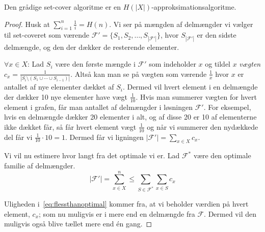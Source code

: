 \begin{theorem}
	Den grådige set-cover algoritme er en $H(|X|)$-approksimationsalgoritme.
\end{theorem}
\begin{proof}
	Husk at $\sum_{i=1}^n \frac{1}{i} = H(n)$. Vi ser på mængden af delmængder vi vælger til set-coveret som værende $\mathcal{F}' = \{S_{1}, S_{2}, \ldots, S_{|\mathcal{F}'|}\}$, hvor $S_{|\mathcal{F}'|}$ er den sidste delmængde, og den der dækker de resterende elementer.

	$\forall x \in X$: Lad $S_{i}$ være den første mængde i $\mathcal{F}'$ som indeholder $x$ og tildel $x$ \textit{vægten} $c_{x} = \frac{1}{|S_{i} \setminus (S_{1} \cup \cdots \cup S_{i-1})|}$. Altså kan man se på vægten som værende $\frac{1}{x}$ hvor $x$ er antallet af nye elementer dækket af $S_{i}$. Dermed vil hvert element i en delmængde der dækker 10 nye elementer have vægt $\frac{1}{10}$. Hvis man summerer vægten for hvert element i grafen, får man antallet af delmængder i løsningen $\mathcal{F}'$. For eksempel, hvis en delmængde dækker 20 elementer i alt, og af disse 20 er 10 af elementerne ikke dækket får, så får hvert element vægt $\frac{1}{10}$ og når vi summerer den nydækkede del får vi $\frac{1}{10} \cdot 10 = 1$. Dermed får vi ligningen $|\mathcal{F}'| = \sum_{x \in X} c_{x}$.

	Vi vil nu estimere hvor langt fra det optimale vi er. Lad $\mathcal{F}^{*}$ være den optimale familie af delmængder.
	\begin{equation}
		\label{eq:flessthanoptimal}
		|\mathcal{F}'| = \sum_{x \in X}^n \le \sum_{S \in \mathcal{F}^{*}} \sum_{x \in S} c_{x}
	\end{equation}

	Uligheden i~\ref{eq:flessthanoptimal} kommer fra, at vi beholder værdien på hvert element, $c_{x}$; som nu muligvis er i mere end en delmængde fra $\mathcal{F}$. Dermed vil den muligvis også blive tællet mere end én gang.


\end{proof}
